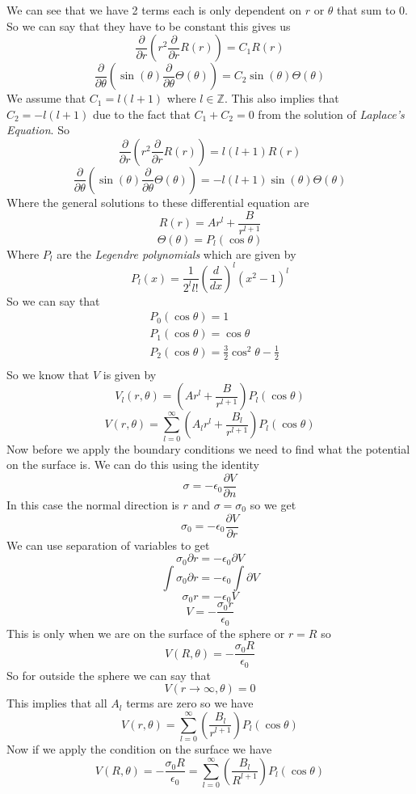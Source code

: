 \documentclass[11pt]{article}
\numberwithin{equation}{section}
\begin{document}
\begin{enumerate}[(i)]
We can see that we have 2 terms each is only dependent on $r$ or $\theta$ that sum to 0. So we can say that they have to be constant this gives us 
$$\frac{\partial}{\partial r}\left(r^2\frac{\partial }{\partial r}R(r)\right) = C_1 R(r)$$
$$\frac{\partial}{\partial \theta}\left(\sin(\theta)\frac{\partial}{\partial \theta}\Theta(\theta)\right) = C_2\sin(\theta)\Theta(\theta)$$ 
We assume that $C_1 = l(l+1)$ where $l\in\mathbb{Z}$. This also implies that $C_2 = -l(l+1)$ due to the fact that $C_1+C_2=0$ from the solution of \emph{Laplace's Equation}. So
$$\frac{\partial}{\partial r}\left(r^2\frac{\partial }{\partial r}R(r)\right) = l(l+1)R(r)$$
$$\frac{\partial}{\partial \theta}\left(\sin(\theta)\frac{\partial}{\partial \theta}\Theta(\theta)\right) =-l(l+1)\sin(\theta)\Theta(\theta)$$ 
Where the general solutions to these differential equation are
$$R(r) = Ar^l+\frac{B}{r^{l+1}}$$
$$\Theta(\theta) = P_l(\cos\theta)$$
Where $P_l$ are the \emph{Legendre polynomials} which are given by
$$P_l(x) = \frac{1}{2^ll!}\left(\frac{d}{dx}\right)^l(x^2-1)^l$$
So we can say that
\begin{align*}
&P_0(\cos\theta) = 1\\
&P_1(\cos\theta) = \cos\theta \\
&P_2(\cos\theta) =  \frac{3}{2}\cos^2\theta-\frac{1}{2}\\ 
\end{align*}
So we know that $V$ is given by
$$V_l(r,\theta) = \left(Ar^l+\frac{B}{r^{l+1}}\right)P_l(\cos\theta)$$
$$V(r,\theta) = \sum_{l=0}^{\infty}\left(A_lr^l+\frac{B_l}{r^{l+1}}\right)P_l(\cos\theta)$$
Now before we apply the boundary conditions we need to find what the potential on the surface is. We can do this using the identity 
$$\sigma = -\epsilon_0 \frac{\partial V}{\partial n}$$
In this case the normal direction is $r$ and $\sigma=\sigma_0$ so we get
$$\sigma_0 = -\epsilon_0 \frac{\partial V}{\partial r}$$
We can use separation of variables to get
$$\sigma_0 \partial r = -\epsilon_0\partial V$$
$$\int\sigma_0 \partial r = -\epsilon_0\int\partial V$$
$$\sigma_0 r = -\epsilon_0 V$$
$$V = -\frac{\sigma_0 r}{\epsilon_0}$$
This is only when we are on the surface of the sphere or $r=R$ so 
$$V(R,\theta) = -\frac{\sigma_0 R}{\epsilon_0}$$
So for outside the sphere we can say that
$$V(r\rightarrow\infty,\theta) = 0$$
This implies that all $A_l$ terms are zero so we have
$$V(r,\theta) = \sum_{l=0}^{\infty}\left(\frac{B_l}{r^{l+1}}\right)P_l(\cos\theta)$$
Now if we apply the condition on the surface we have
$$V(R,\theta) = -\frac{\sigma_0 R}{\epsilon_0} = \sum_{l=0}^{\infty}\left(\frac{B_l}{R^{l+1}}\right)P_l(\cos\theta)$$

\end{enumerate}
\end{document}
